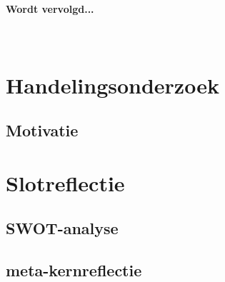 \documentclass[a4paper,11pt]{article}
\newcommand{\tussen}[1]{\paragraph*{#1}\mbox{}\\}
\theoremstyle{definition}
\begin{document}
\tussen{Wordt vervolgd...}

\section{Handelingsonderzoek}
\subsection{Motivatie}
\subsection{}
\section{Slotreflectie}
\subsection{SWOT-analyse}
\subsection{meta-kernreflectie}

 
\end{document}
